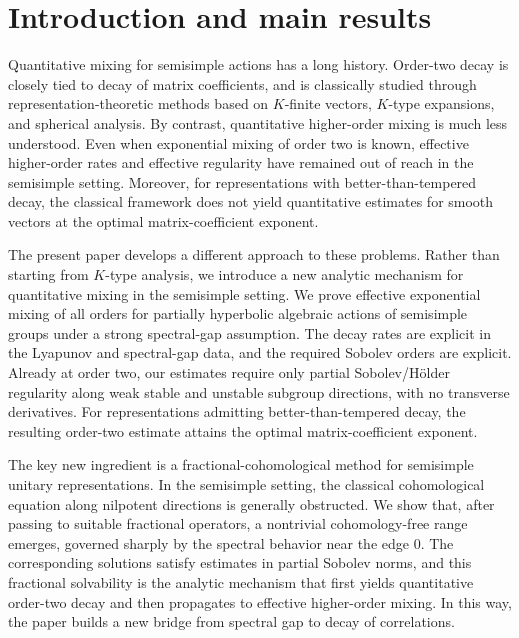 \documentclass[11 pt]{amsart}
\theoremstyle{definition}
\numberwithin{equation}{section}
\begin{document}

\maketitle

\setcounter{tocdepth}{2}


\tableofcontents


\section{Introduction and main results}

Quantitative mixing for semisimple actions has a long history. Order-two decay is closely tied to decay of matrix coefficients, and is classically studied through representation-theoretic methods based on $K$-finite vectors, $K$-type expansions, and spherical analysis. By contrast, quantitative higher-order mixing is much less understood. Even when exponential mixing of order two is known, effective higher-order rates and effective regularity have remained out of reach in the semisimple setting. Moreover, for representations with
better-than-tempered decay, the classical framework does not yield
quantitative estimates for smooth vectors at the optimal
matrix-coefficient exponent.



The present paper develops a different approach to these problems. Rather than starting from $K$-type analysis, we introduce a new analytic mechanism for quantitative mixing in the semisimple setting. We prove effective exponential mixing of all orders for partially hyperbolic algebraic actions of semisimple groups under a strong spectral-gap assumption. The decay rates are explicit in the Lyapunov and spectral-gap data, and the required Sobolev orders are explicit. Already at order two, our estimates require only partial Sobolev/H\"{o}lder regularity along weak stable and unstable subgroup directions, with no transverse derivatives. For representations admitting better-than-tempered decay, the resulting order-two estimate attains the optimal matrix-coefficient exponent.




The key new ingredient is a fractional-cohomological method for semisimple unitary representations. In the semisimple setting, the classical cohomological equation along nilpotent directions is generally obstructed. We show that, after passing to suitable fractional operators, a nontrivial cohomology-free range emerges, governed sharply by the spectral behavior near the edge 0. The corresponding solutions satisfy estimates in partial Sobolev norms, and this fractional solvability is the analytic mechanism that first yields quantitative order-two decay and then propagates to effective higher-order mixing. In this way, the paper builds a new bridge from spectral gap to decay of correlations.
\end{document}
